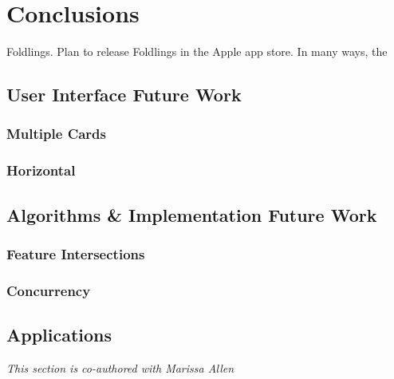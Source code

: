 \chapter{Conclusions}

Foldlings. Plan to release Foldlings in the Apple app store. In many
ways, the

\section{User Interface Future Work}\label{user-interface-future-work}

\subsection{Multiple Cards}\label{multiple-cards}

\citet{hart2007modular}

\subsection{Horizontal}\label{horizontal}

\section{Algorithms \& Implementation Future
Work}\label{algorithms-implementation-future-work}

\subsection{Feature Intersections}\label{feature-intersections}

\subsection{Concurrency}\label{concurrency}

\section{Applications}\label{applications}

\emph{This section is co-authored with Marissa Allen}
